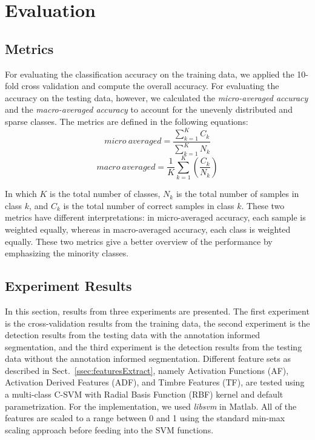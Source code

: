 \documentclass{article}
\begin{document}
{{{{{%

\section{Evaluation}\label{sec:eval}
\subsection{Metrics}\label{ssec:metrics}
For evaluating the classification accuracy on the training data, we applied the 10-fold cross validation and compute the overall accuracy. For evaluating the accuracy on the testing data, however, we calculated the \textit{micro-averaged accuracy} and the \textit{macro-averaged accuracy}\cite{yang1999} to account for the unevenly distributed and sparse classes. The metrics are defined in the following equations:
\begin{equation}
micro~averaged = \frac{ \sum_{k = 1}^{K} C_{k} }{ \sum_{k = 1}^{K} N_{k} }
\end{equation}
\begin{equation}
macro~averaged = \frac{1}{K} \sum_{k = 1}^{K} (\frac{C_{k}}{N_{k}})
\end{equation}

In which $K$ is the total number of classes, $N_{k}$ is the total number of samples in class $k$, and $C_{k}$ is the total number of correct samples in class $k$. These two metrics have different interpretations: in micro-averaged accuracy, each sample is weighted equally, whereas in macro-averaged accuracy, each class is weighted equally. These two metrics give a better overview of the performance by emphasizing the minority classes.  


\subsection{Experiment Results}\label{ssec:results}
In this section, results from three experiments are presented. The first experiment is the cross-validation results from the training data, the second experiment is the detection results from the testing data with the annotation informed segmentation, and the third experiment is the detection results from the testing data without the annotation informed segmentation. Different feature sets as described in Sect.~\ref{ssec:featuresExtract}, namely Activation Functions (AF), Activation Derived Features (ADF), and Timbre Features (TF), are tested using a multi-class C-SVM with Radial Basis Function (RBF) kernel and default parametrization. For the implementation, we used \textit{libsvm}\cite{Chang2011} in Matlab.  All of the features are scaled to a range between 0 and 1 using the standard min-max scaling approach before feeding into the SVM functions. 

}}}}}
\end{document}
